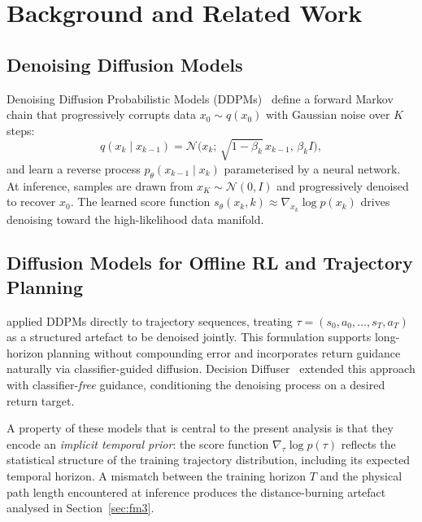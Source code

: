 \documentclass[12pt, a4paper, oneside]{report}
\theoremstyle{definition}
\begin{document}
\chapter{Background and Related Work}
\label{chap:background}

\section{Denoising Diffusion Models}
\label{sec:bg_ddpm}

Denoising Diffusion Probabilistic Models
(DDPMs)~\citep{ho2020ddpm} define a forward Markov chain that
progressively corrupts data $x_0 \sim q(x_0)$ with Gaussian noise
over $K$ steps:
\begin{equation}
  q(x_k \mid x_{k-1}) =
    \mathcal{N}\!\bigl(x_k;\,\sqrt{1-\beta_k}\,x_{k-1},\,\beta_k I\bigr),
  \label{eq:ddpm_forward}
\end{equation}
and learn a reverse process $p_\theta(x_{k-1} \mid x_k)$
parameterised by a neural network. At inference, samples are drawn
from $x_K \sim \mathcal{N}(0,I)$ and progressively denoised to
recover $x_0$. The learned score function
$s_\theta(x_k, k) \approx \nabla_{x_k} \log p(x_k)$ drives
denoising toward the high-likelihood data manifold.

\section{Diffusion Models for Offline RL and Trajectory Planning}
\label{sec:bg_diffusion}

\citet{janner2022diffuser} applied DDPMs directly to trajectory
sequences, treating $\tau = (s_0, a_0, \ldots, s_T, a_T)$ as a
structured artefact to be denoised jointly. This formulation
supports long-horizon planning without compounding error and
incorporates return guidance naturally via classifier-guided
diffusion. Decision Diffuser~\citep{ajay2023is} extended this
approach with classifier-\emph{free} guidance, conditioning the
denoising process on a desired return target.

A property of these models that is central to the present analysis
is that they encode an \emph{implicit temporal prior}: the score
function $\nabla_\tau \log p(\tau)$ reflects the statistical
structure of the training trajectory distribution, including its
expected temporal horizon. A mismatch between the training horizon
$T$ and the physical path length encountered at inference produces
the distance-burning artefact analysed in Section~\ref{sec:fm3}.
\end{document}
